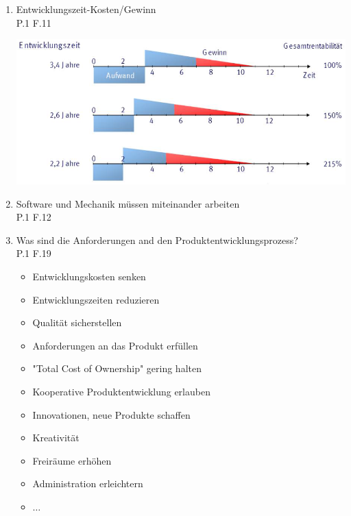 \documentclass[10pt,a4paper,fleqn]{article}
\begin{document}
\begin{enumerate}
\begin{center}
	\end{center}	
\item Entwicklungszeit-Kosten/Gewinn\\
	P.1 F.11\\
	\begin{center}
		\includegraphics[scale=0.4]{timetomarket.png}
	\end{center}
\item Software und Mechanik müssen miteinander arbeiten\\
	P.1 F.12
\item Was sind die Anforderungen and den Produktentwicklungsprozess?\\
	P.1 F.19
	\begin{itemize}
		\item Entwicklungskosten senken
		\item Entwicklungszeiten reduzieren
		\item Qualität sicherstellen
		\item Anforderungen an das Produkt erfüllen
		\item "Total Cost of Ownership" gering halten
		\item Kooperative Produktentwicklung erlauben
		\item Innovationen, neue Produkte schaffen
		\item Kreativität\item Freiräume erhöhen
		\item Administration erleichtern
		\item $\dots$
	\end{itemize}

\end{enumerate}
\end{document}
